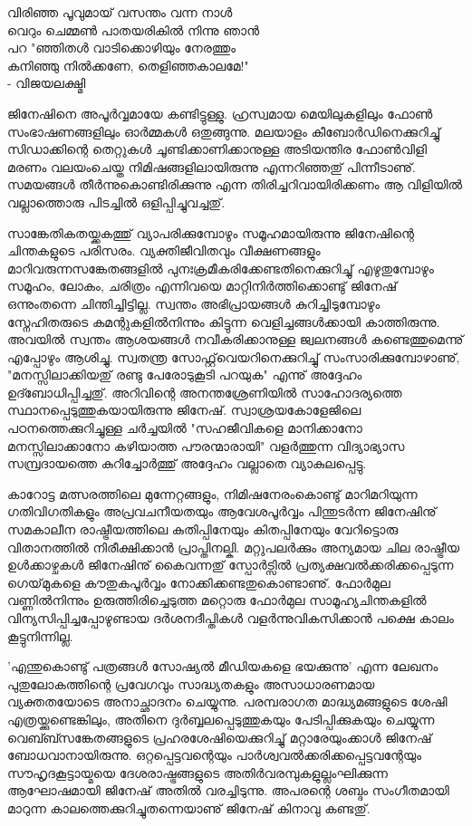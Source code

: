 ﻿
{\vskip 2pt}

\begin{center}
വിരിഞ്ഞ പൂവുമായ് വസന്തം വന്ന നാള്‍\\
വെറും ചെമ്മണ്‍ പാതയരികില്‍ നിന്നു ഞാന്‍\\
പറ "ഞ്ഞിതള്‍ വാടിക്കൊഴിയും നേരത്തും\\
കനിഞ്ഞു നില്‍ക്കണേ, തെളിഞ്ഞകാലമേ!"\\
- വിജയലക്ഷ്മി
\end{center}

{\vskip 12pt}

ജിനേഷിനെ അപൂര്‍വ്വമായേ കണ്ടിട്ടുള്ളു. ഹ്രസ്വമായ മെയിലുകളിലും ഫോണ്‍ സംഭാഷണങ്ങളിലും ഓര്‍മ്മകള്‍ ഒതുങ്ങുന്നു. മലയാളം കീബോര്‍ഡിനെക്കുറിച്ചു് സിഡാക്കിന്റെ തെറ്റുകള്‍ ചൂണ്ടിക്കാണിക്കാനുള്ള അടിയന്തിര ഫോണ്‍വിളി മരണം വലയംചെയ്ത നിമിഷങ്ങളിലായിരുന്നു എന്നറിഞ്ഞതു് പിന്നീടാണു്. സമയങ്ങള്‍ തീര്‍ന്നുകൊണ്ടിരിക്കുന്നു എന്ന തിരിച്ചറിവായിരിക്കണം ആ വിളിയില്‍ വല്ലാത്തൊരു പിടച്ചില്‍ ഒളിപ്പിച്ചുവച്ചതു്.

സാങ്കേതികതയ്ക്കകത്തു് വ്യാപരിക്കുമ്പോഴും സമൂഹമായിരുന്നു ജിനേഷിന്റെ ചിന്തകളുടെ പരിസരം. വ്യക്തിജീവിതവും വീക്ഷണങ്ങളും മാറിവരുന്നസങ്കേതങ്ങളില്‍ പുനഃക്രമീകരിക്കേണ്ടതിനെക്കുറിച്ചു് എഴുതുമ്പോഴും സമൂഹം, ലോകം, ചരിത്രം എന്നിവയെ മാറ്റിനിര്‍ത്തിക്കൊണ്ടു് ജിനേഷ് ഒന്നുംതന്നെ ചിന്തിച്ചിട്ടില്ല. സ്വന്തം അഭിപ്രായങ്ങള്‍ കുറിച്ചിടുമ്പോഴും സ്നേഹിതരുടെ കമന്റുകളില്‍നിന്നും കിട്ടുന്ന വെളിച്ചങ്ങള്‍ക്കായി കാത്തിരുന്നു. അവയില്‍ സ്വന്തം ആശയങ്ങള്‍ നവീകരിക്കാനുള്ള ജ്വലനങ്ങള്‍ കണ്ടെത്തുമെന്നു് എപ്പോഴും ആശിച്ചു. സ്വതന്ത്ര സോഫ്റ്റ്‌വെയറിനെക്കുറിച്ചു് സംസാരിക്കുമ്പോഴാണു്, "മനസ്സിലാക്കിയതു് രണ്ടു പേരോടുകൂടി പറയുക" എന്നു് അദ്ദേഹം ഉദ്ബോധിപ്പിച്ചതു്. അറിവിന്റെ അനന്തശ്രേണിയില്‍ സാഹോദര്യത്തെ സ്ഥാനപ്പെടുത്തുകയായിരുന്നു ജിനേഷ്. സ്വാശ്രയകോളേജിലെ പഠനത്തെക്കുറിച്ചുള്ള ചര്‍ച്ചയില്‍ "സഹജീവികളെ മാനിക്കാനോ മനസ്സിലാക്കാനോ കഴിയാത്ത പൗരന്മാരായി" വളര്‍ത്തുന്ന വിദ്യാഭ്യാസ സമ്പ്രദായത്തെ കുറിച്ചോര്‍ത്തു് അദ്ദേഹം വല്ലാതെ വ്യാകുലപ്പെട്ടു.

കാറോട്ട മത്സരത്തിലെ മുന്നേറ്റങ്ങളും, നിമിഷനേരംകൊണ്ടു് മാറിമറിയുന്ന ഗതിവിഗതികളും അപ്രവചനീയതയും ആവേശപൂര്‍വ്വം പിന്തുടര്‍ന്ന ജിനേഷിനു് സമകാലീന രാഷ്ട്രീയത്തിലെ കുതിപ്പിനേയും കിതപ്പിനേയും വേറിട്ടൊരു വിതാനത്തില്‍ നിരീക്ഷിക്കാന്‍ പ്രാപ്തിനല്കി. മറ്റുപലര്‍ക്കും അന്യമായ ചില രാഷ്ട്രീയ ഉള്‍ക്കാഴ്ചകള്‍ ജിനേഷിനു് കൈവന്നതു് സ്പോര്‍ട്സില്‍ പ്രത്യക്ഷവല്‍ക്കരിക്കപ്പെടുന്ന ഗെയ്‌മുകളെ കൗതുകപൂര്‍വ്വം നോക്കിക്കണ്ടതുകൊണ്ടാണു്. ഫോര്‍മുല വണ്ണില്‍നിന്നും ഉരുത്തിരിച്ചെടുത്ത മറ്റൊരു ഫോര്‍മുല സാമൂഹ്യചിന്തകളില്‍ വിന്യസിപ്പിച്ചപ്പോഴുണ്ടായ ദര്‍ശനദീപ്തികള്‍ വളര്‍ന്നുവികസിക്കാന്‍ പക്ഷെ കാലം കൂട്ടുനിന്നില്ല.

'എന്തുകൊണ്ടു് പത്രങ്ങള്‍ സോഷ്യല്‍ മീഡിയകളെ ഭയക്കുന്നു' എന്ന ലേഖനം പുതുലോകത്തിന്റെ പ്രവേഗവും സാദ്ധ്യതകളും അസാധാരണമായ വ്യക്തതയോടെ അനാച്ഛാദനം ചെയ്യുന്നു. പരമ്പരാഗത മാദ്ധ്യമങ്ങളുടെ ശേഷി എത്രയ്ക്കുണ്ടെങ്കിലും, അതിനെ ദുര്‍ബ്ബലപ്പെടുത്തുകയും പേടിപ്പിക്കുകയും ചെയ്യുന്ന വെബ്ബ്സങ്കേതങ്ങളുടെ പ്രഹരശേഷിയെക്കുറിച്ചു് മറ്റാരേയുംക്കാള്‍ ജിനേഷ് ബോധവാനായിരുന്നു. ഒറ്റപ്പെട്ടവന്റെയും പാര്‍ശ്വവല്‍ക്കരിക്കപ്പെട്ടവന്റേയും സൗഹൃദകൂട്ടായ്മയെ ദേശരാഷ്ട്രങ്ങളുടെ അതിര്‍വരമ്പുകളുല്ലംഘിക്കുന്ന ആഘോഷമായി ജിനേഷ് അതില്‍ വരച്ചിടുന്നു. അപരന്റെ ശബ്ദം സംഗീതമായി മാറുന്ന കാലത്തെക്കുറിച്ചുതന്നെയാണു് ജിനേഷ് കിനാവു കണ്ടതു്.


